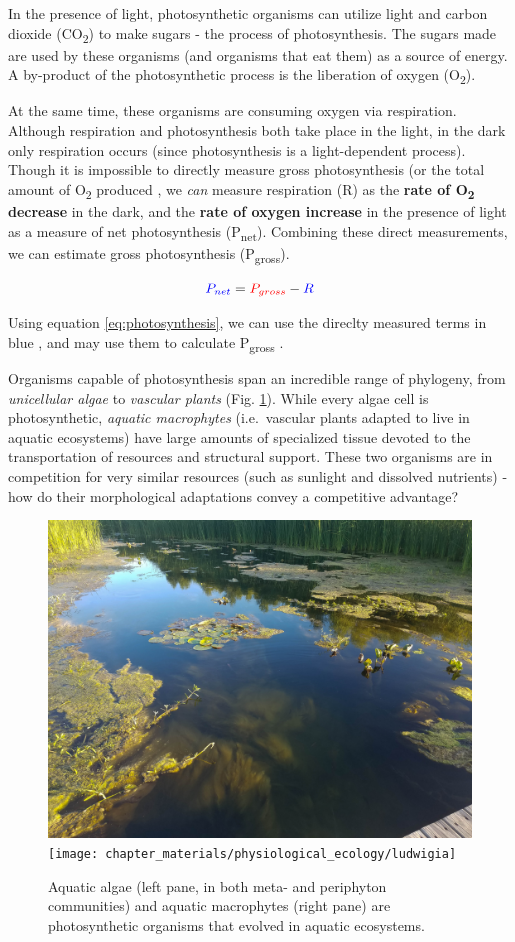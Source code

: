 \documentclass[]{book}
\theoremstyle{definition}
\theoremstyle{definition}
\theoremstyle{definition}
\theoremstyle{remark}
\begin{document}
\newcommand{\textunderscript}[1]{$_{\text{#1}}$}

In the presence of light, photosynthetic organisms can utilize light and
carbon dioxide (CO\textsubscript{2}) to make sugars - the process of
photosynthesis. The sugars made are used by these organisms (and
organisms that eat them) as a source of energy. A by-product of the
photosynthetic process is the liberation of oxygen (O\textsubscript{2}).

At the same time, these organisms are consuming oxygen via respiration.
Although respiration and photosynthesis both take place in the light, in
the dark only respiration occurs (since photosynthesis is a
light-dependent process). Though it is impossible to directly measure
gross photosynthesis (or the total amount of O\textsubscript{2} produced
\citep{wohlfahrt_many_2015}, we \emph{can} measure respiration (R) as
the \textbf{rate of O\textsubscript{2} decrease} in the dark, and the
\textbf{rate of oxygen increase} in the presence of light as a measure
of net photosynthesis (P\textsubscript{net}). Combining these direct
measurements, we can estimate gross photosynthesis
(P\textsubscript{gross}).

\begin{equation}
\color{blue} P_{net} \color{black}= \color{red}P_{gross} \color{black}- \color{blue}R
\label{eq:photosynthesis}
\end{equation}

Using equation \eqref{eq:photosynthesis}, we can use the direclty measured
terms in \color{blue} blue \color{black}, and may use them to calculate
\color{red} P\textsubscript{gross} \color{black}.

Organisms capable of photosynthesis span an incredible range of
phylogeny, from \emph{unicellular algae} to \emph{vascular plants} (Fig.
\ref{fig:organisms}). While every algae cell is photosynthetic,
\emph{aquatic macrophytes} (i.e.~vascular plants adapted to live in
aquatic ecosystems) have large amounts of specialized tissue devoted to
the transportation of resources and structural support. These two
organisms are in competition for very similar resources (such as
sunlight and dissolved nutrients) - how do their morphological
adaptations convey a competitive advantage?

\begin{figure}
\includegraphics[width=0.5\linewidth]{chapter_materials/physiological_ecology/aquatic_photosynthesis} \texttt{[image: chapter\_materials/physiological\_ecology/ludwigia]} \caption{Aquatic algae (left pane, in both meta- and periphyton communities) and aquatic macrophytes (right pane) are photosynthetic organisms that evolved in aquatic ecosystems.}\label{fig:organisms}
\end{figure}
\end{document}

